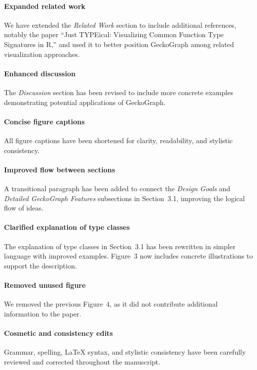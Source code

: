 \documentclass{article}
\begin{document}
\paragraph{Expanded related work} We have extended the \textit{Related Work} section to include additional references, notably the paper “Just TYPEical: Visualizing Common Function Type Signatures in R,” and used it to better position GeckoGraph among related visualization approaches.

\paragraph{Enhanced discussion} The \textit{Discussion} section has been revised to include more concrete examples demonstrating potential applications of GeckoGraph.

\paragraph{Concise figure captions} All figure captions have been shortened for clarity, readability, and stylistic consistency.

\paragraph{Improved flow between sections} A transitional paragraph has been added to connect the \textit{Design Goals} and \textit{Detailed GeckoGraph Features} subsections in Section~3.1, improving the logical flow of ideas.

\paragraph{Clarified explanation of type classes} The explanation of type classes in Section~3.1 has been rewritten in simpler language with improved examples. Figure~3 now includes concrete illustrations to support the description.

\paragraph{Removed unused figure} We removed the previous Figure~4, as it did not contribute additional information to the paper.

\paragraph{Cosmetic and consistency edits} Grammar, spelling, LaTeX syntax, and stylistic consistency have been carefully reviewed and corrected throughout the manuscript.
\end{document}
